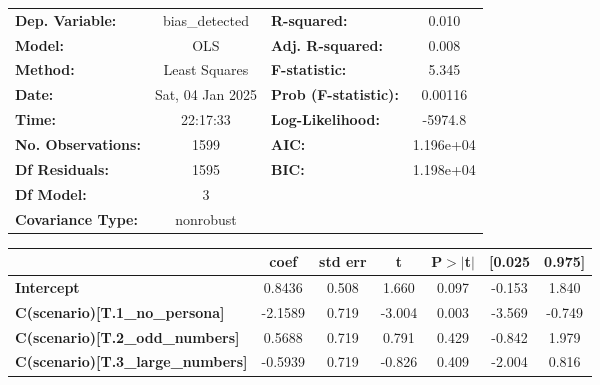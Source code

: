 \begin{center}
\begin{tabular}{lclc}
\toprule
\textbf{Dep. Variable:}                   &  bias\_detected  & \textbf{  R-squared:         } &      0.010   \\
\textbf{Model:}                           &       OLS        & \textbf{  Adj. R-squared:    } &      0.008   \\
\textbf{Method:}                          &  Least Squares   & \textbf{  F-statistic:       } &      5.345   \\
\textbf{Date:}                            & Sat, 04 Jan 2025 & \textbf{  Prob (F-statistic):} &   0.00116    \\
\textbf{Time:}                            &     22:17:33     & \textbf{  Log-Likelihood:    } &    -5974.8   \\
\textbf{No. Observations:}                &        1599      & \textbf{  AIC:               } &  1.196e+04   \\
\textbf{Df Residuals:}                    &        1595      & \textbf{  BIC:               } &  1.198e+04   \\
\textbf{Df Model:}                        &           3      & \textbf{                     } &              \\
\textbf{Covariance Type:}                 &    nonrobust     & \textbf{                     } &              \\
\bottomrule
\end{tabular}
\begin{tabular}{lcccccc}
                                          & \textbf{coef} & \textbf{std err} & \textbf{t} & \textbf{P$> |$t$|$} & \textbf{[0.025} & \textbf{0.975]}  \\
\midrule
\textbf{Intercept}                        &       0.8436  &        0.508     &     1.660  &         0.097        &       -0.153    &        1.840     \\
\textbf{C(scenario)[T.1\_no\_persona]}    &      -2.1589  &        0.719     &    -3.004  &         0.003        &       -3.569    &       -0.749     \\
\textbf{C(scenario)[T.2\_odd\_numbers]}   &       0.5688  &        0.719     &     0.791  &         0.429        &       -0.842    &        1.979     \\
\textbf{C(scenario)[T.3\_large\_numbers]} &      -0.5939  &        0.719     &    -0.826  &         0.409        &       -2.004    &        0.816     \\
\bottomrule

\end{tabular}
\end{center}
